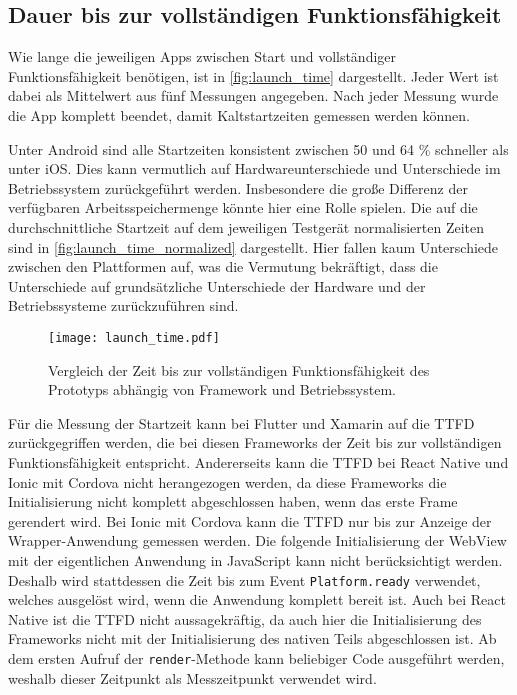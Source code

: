 \subsection{Dauer bis zur vollständigen Funktionsfähigkeit}

Wie lange die jeweiligen Apps zwischen Start und vollständiger Funktionsfähigkeit benötigen, ist in \autoref{fig:launch_time} dargestellt.
Jeder Wert ist dabei als Mittelwert aus fünf Messungen angegeben.
Nach jeder Messung wurde die App komplett beendet, damit Kaltstartzeiten gemessen werden können.

Unter Android sind alle Startzeiten konsistent zwischen 50 und 64 \% schneller als unter iOS.
Dies kann vermutlich auf Hardwareunterschiede und Unterschiede im Betriebssystem zurückgeführt werden.
Insbesondere die große Differenz der verfügbaren Arbeitsspeichermenge könnte hier eine Rolle spielen.
Die auf die durchschnittliche Startzeit auf dem jeweiligen Testgerät normalisierten Zeiten sind in \autoref{fig:launch_time_normalized} dargestellt.
Hier fallen kaum Unterschiede zwischen den Plattformen auf, was die Vermutung bekräftigt, dass die Unterschiede auf grundsätzliche Unterschiede der Hardware und der Betriebssysteme zurückzuführen sind.
\begin{figure}[ht]
  \centering 
  \texttt{[image: launch\_time.pdf]}
  \caption{Vergleich der Zeit bis zur vollständigen Funktionsfähigkeit des Prototyps abhängig von Framework und Betriebssystem.}
  \label{fig:launch_time}
\end{figure}


Für die Messung der Startzeit kann bei Flutter und Xamarin auf die \ac{TTFD} zurückgegriffen werden, die bei diesen Frameworks der Zeit bis zur vollständigen Funktionsfähigkeit entspricht.
Andererseits kann die \ac{TTFD} bei React Native und Ionic mit Cordova nicht herangezogen werden, da diese Frameworks die Initialisierung nicht komplett abgeschlossen haben, wenn das erste Frame gerendert wird.
Bei Ionic mit Cordova kann die \ac{TTFD} nur bis zur Anzeige der Wrapper-Anwendung gemessen werden.
Die folgende Initialisierung der WebView mit der eigentlichen Anwendung in JavaScript kann nicht berücksichtigt werden.
Deshalb wird stattdessen die Zeit bis zum Event \texttt{Platform.ready} verwendet, welches ausgelöst wird, wenn die Anwendung komplett bereit ist.
Auch bei React Native ist die \ac{TTFD} nicht aussagekräftig, da auch hier die Initialisierung des Frameworks nicht mit der Initialisierung des nativen Teils abgeschlossen ist.
Ab dem ersten Aufruf der \texttt{render}-Methode kann beliebiger Code ausgeführt werden, weshalb dieser Zeitpunkt als Messzeitpunkt verwendet wird.

